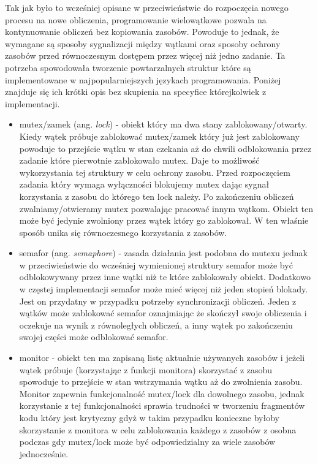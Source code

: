 Tak jak było to wcześniej opisane w przeciwieństwie do rozpoczęcia nowego procesu na nowe obliczenia, programowanie wielowątkowe pozwala na kontynuowanie obliczeń bez kopiowania zasobów. 
Powoduje to jednak, że wymagane są sposoby sygnalizacji między wątkami oraz sposoby ochrony zasobów przed równoczesnym dostępem przez więcej niż jedno zadanie. 
Ta potrzeba spowodowała tworzenie powtarzalnych struktur które są implementowane w najpopularniejszych językach programowania. 
Poniżej znajduje się ich krótki opis bez skupienia na specyfice którejkolwiek z implementacji. 
\begin{itemize}
        \item mutex/zamek (ang. \textit{lock}) - obiekt który ma dwa stany zablokowany/otwarty.
        Kiedy wątek próbuje zablokować mutex/zamek który już jest zablokowany powoduje to przejście wątku w stan czekania aż do chwili odblokowania przez zadanie które pierwotnie zablokowało mutex.
        Daje to możliwość wykorzystania tej struktury w celu ochrony zasobu. Przed rozpoczęciem zadania który wymaga wyłączności blokujemy mutex dając sygnał korzystania z zasobu do którego ten lock należy. 
        Po zakończeniu obliczeń zwalniamy/otwieramy mutex pozwalając pracować innym wątkom. Obiekt ten może być jedynie zwolniony przez wątek który go zablokował. 
        W ten właśnie sposób unika się równoczesnego korzystania z zasobów. 
        \item semafor (ang. \textit{semaphore}) - zasada działania jest podobna do mutexu jednak w przeciwieństwie do wcześniej wymienionej struktury semafor może być odblokowywany przez inne wątki niż te które zablokowały obiekt. Dodatkowo w częstej implementacji semafor może mieć więcej niż jeden stopień blokady. 
        Jest on przydatny w przypadku potrzeby synchronizacji obliczeń. Jeden z wątków może zablokować semafor oznajmiając że skończył swoje obliczenia i oczekuje na wynik z równoległych obliczeń, a inny wątek po zakończeniu swojej części może odblokować semafor. 
        \item monitor - obiekt ten ma zapisaną listę aktualnie używanych zasobów i jeżeli wątek próbuje (korzystając z funkcji monitora) skorzystać z zasobu spowoduje to przejście w stan wstrzymania wątku aż do zwolnienia zasobu. 
        Monitor zapewnia funkcjonalność mutex/lock dla dowolnego zasobu, jednak korzystanie z tej funkcjonalności sprawia trudności w tworzeniu fragmentów kodu który jest krytyczny gdyż w takim przypadku konieczne byłoby skorzystanie z monitora w celu zablokowania każdego z zasobów z osobna podczas gdy mutex/lock może być odpowiedzialny za wiele zasobów jednocześnie.   
\end{itemize} 

